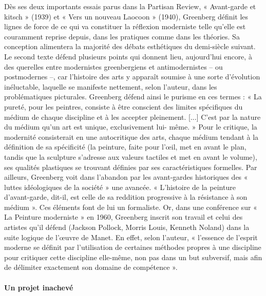 Dès ses deux importants essais parus dans la Partisan Review, « Avant-garde et kitsch » (1939) et « Vers un nouveau Laocoon » (1940), Greenberg définit les lignes de force de ce qui va constituer la réflexion moderniste telle qu'elle est couramment reprise depuis, dans les pratiques comme dans les théories. Sa conception alimentera la majorité des débats esthétiques du demi-siècle suivant. Le second texte défend plusieurs points qui donnent lieu, aujourd'hui encore, à des querelles entre modernistes greenbergiens et antimodernistes – ou postmodernes –, car l'histoire des arts y apparaît soumise à une sorte d'évolution inéluctable, laquelle se manifeste nettement, selon l'auteur, dans les problématiques picturales.
Greenberg défend ainsi le purisme en ces termes : « La pureté, pour les peintres, consiste à être conscient des limites spécifiques du médium de chaque discipline et à les accepter pleinement. [...] C'est par la nature du médium qu'un art est unique, exclusivement lui- même. » Pour le critique, la modernité consisterait en une autocritique des arts, chaque médium tendant à la définition de sa spécificité (la peinture, faite pour l'œil, met en avant le plan, tandis que la sculpture s'adresse aux valeurs tactiles et met en avant le volume), ses qualités plastiques se trouvant définies par ses caractéristiques formelles. Par ailleurs, Greenberg voit dans l'abandon par les avant-gardes historiques des « luttes idéologiques de la société » une avancée. « L'histoire de la peinture d'avant-garde, dit-il, est celle de sa reddition progressive à la résistance à son médium ». Ces éléments font de lui un formaliste.
Or, dans une conférence sur « La Peinture moderniste » en 1960, Greenberg inscrit son travail et celui des artistes qu'il défend (Jackson Pollock, Morris Louis, Kenneth Noland) dans la suite logique de l'œuvre de Manet. En effet, selon l'auteur, « l'essence de l'esprit
moderne se définit par l'utilisation de certaines méthodes propres à une discipline pour critiquer cette discipline elle-même, non pas dans un but subversif, mais afin de délimiter exactement son domaine de compétence ».

\paragraph{Un projet inachevé}


